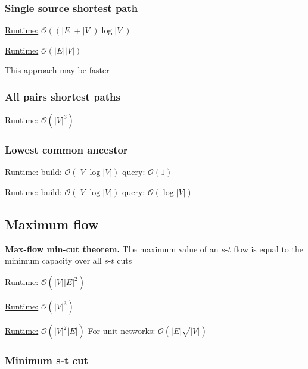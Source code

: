 \subsubsection{Single source shortest path}
\underline{Runtime:}
$\mathcal{O}((\lvert E \rvert + \lvert V \rvert )\log \lvert V
\rvert)$

\underline{Runtime:} $\mathcal{O}(\lvert E \rvert \lvert V \rvert)$

This approach may be faster
\subsubsection{All pairs shortest paths}
\underline{Runtime:} $\mathcal{O}(\lvert V \rvert^3)$

\subsubsection{Lowest common ancestor}
\underline{Runtime:} build: $\mathcal{O}(\lvert V \rvert \log \lvert
V\rvert)$ query: $\mathcal{O}(1)$

\underline{Runtime:} build: $\mathcal{O}(|V|\log |V|)$ query: $\mathcal{O}(\log|V|)$

\subsection{Maximum flow}

\textbf{Max-flow min-cut theorem.} The maximum value of an $s$-$t$ flow is
equal to the minimum capacity over all $s$-$t$ cuts

\underline{Runtime:} $\mathcal{O}(\lvert V \rvert \lvert E \rvert^2)$

\underline{Runtime:} $\mathcal{O}(\left| V \right|^3)$

\underline{Runtime:} $\mathcal{O}(|V|^2|E|)$ For unit networks: $\mathcal{O}(|E|\sqrt{|V|})$

\subsubsection{Minimum s-t cut}

